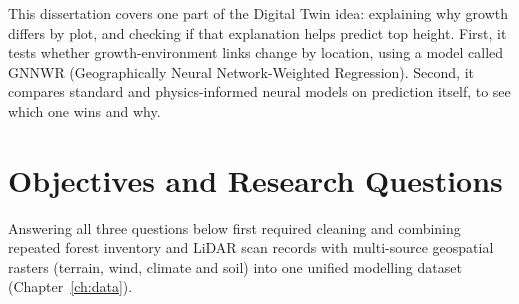 This dissertation covers one part of the Digital Twin idea: explaining why growth differs by plot, and checking if that explanation helps predict top height. First, it tests whether growth-environment links change by location, using a model called GNNWR (Geographically Neural Network-Weighted Regression). Second, it compares standard and physics-informed neural models on prediction itself, to see which one wins and why.

\section{Objectives and Research Questions}

Answering all three questions below first required cleaning and combining repeated forest
inventory and LiDAR scan records with multi-source geospatial rasters (terrain, wind, climate
and soil) into one unified modelling dataset (Chapter~\ref{ch:data}).

